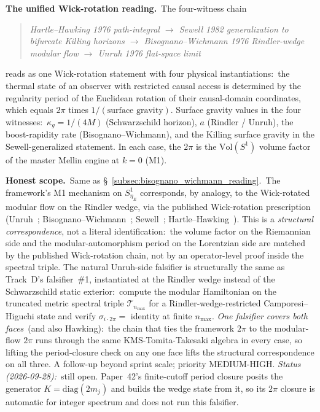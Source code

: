 \documentclass[11pt]{article}
\begin{document}
\textbf{The unified Wick-rotation reading.}\ The four-witness chain
\begin{quote}\itshape
  Hartle--Hawking 1976 path-integral $\to$ Sewell 1982 generalization
  to bifurcate Killing horizons $\to$ Bisognano--Wichmann 1976
  Rindler-wedge modular flow $\to$ Unruh 1976 flat-space limit
\end{quote}
reads as one Wick-rotation statement with four physical instantiations:\ the
thermal state of an observer with restricted causal access is
determined by the regularity period of the Euclidean rotation of
their causal-domain coordinates, which equals $2\pi$ times
$1/(\text{surface gravity})$.  Surface gravity values in the four
witnesses:\ $\kappa_g = 1/(4M)$ (Schwarzschild horizon), $a$
(Rindler / Unruh), the boost-rapidity rate (Bisognano--Wichmann), and
the Killing surface gravity in the Sewell-generalized statement.  In
each case, the $2\pi$ is the $\mathrm{Vol}(S^1)$ volume factor of
the master Mellin engine at $k = 0$ (M1).

\textbf{Honest scope.}\ Same as
\S~\ref{subsec:bisognano_wichmann_reading}.\ The framework's M1
mechanism on $S^1_{\eta_E}$ corresponds, by analogy, to the Wick-rotated
modular flow on the Rindler wedge, via the published Wick-rotation prescription
(Unruh~\cite{unruh1976}; Bisognano--Wichmann~\cite{bisognano_wichmann1976};
Sewell~\cite{sewell1982}; Hartle--Hawking~\cite{hartle_hawking1976}).
This is a \emph{structural correspondence}, not a literal identification:\
the volume factor on the Riemannian side and the
modular-automorphism period on the Lorentzian side are matched by the
published Wick-rotation chain, not by an operator-level proof inside
the spectral triple.  The natural Unruh-side falsifier is structurally
the same as Track~D's falsifier~\#1, instantiated at the Rindler wedge
instead of the Schwarzschild static exterior:\ compute the modular
Hamiltonian on the truncated metric spectral triple
$\mathcal{T}_{n_{\max}}$ for a Rindler-wedge-restricted
Camporesi--Higuchi state and verify $\sigma_{i\cdot 2\pi} = $ identity
at finite $n_{\max}$.  \emph{One falsifier covers both faces}\ (and
also Hawking):\ the chain that ties the framework $2\pi$ to the
modular-flow $2\pi$ runs through the same KMS-Tomita-Takesaki algebra
in every case, so lifting the period-closure check on any one face
lifts the structural correspondence on all three.  A follow-up
beyond sprint scale; priority MEDIUM-HIGH.  \emph{Status (2026-09-28):}\
still open.  Paper~42's finite-cutoff period closure posits the
generator $K = \mathrm{diag}(2m_j)$ and builds the wedge state from it,
so its $2\pi$ closure is automatic for integer spectrum and does not run
this falsifier.
\end{document}
